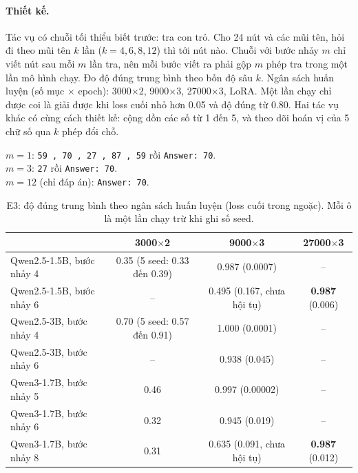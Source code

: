 \documentclass[11pt]{article}
\begin{document}
\paragraph{Thiết kế.} Tác vụ có chuỗi tối thiểu biết trước: tra con trỏ. Cho 24 nút và các mũi tên, hỏi đi
theo mũi tên $k$ lần ($k=4,6,8,12$) thì tới nút nào. Chuỗi với bước nhảy $m$ chỉ viết nút sau mỗi $m$ lần
tra, nên mỗi bước viết ra phải gộp $m$ phép tra trong một lần mô hình chạy. Đo độ đúng trung bình theo bốn
độ sâu $k$. Ngân sách huấn luyện (số mục $\times$ epoch): 3000$\times$2, 9000$\times$3, 27000$\times$3,
LoRA. Một lần chạy chỉ được coi là giải được khi loss cuối nhỏ hơn 0.05 và độ đúng từ 0.80. Hai tác vụ
khác có cùng cách thiết kế: cộng dồn các số từ 1 đến 5, và theo dõi hoán vị của 5 chữ số qua $k$ phép đổi
chỗ.

\begin{vidu}
$m=1$: \texttt{59 , 70 , 27 , 87 , 59} rồi \texttt{Answer: 70}.\\
$m=3$: \texttt{27} rồi \texttt{Answer: 70}.\\
$m=12$ (chỉ đáp án): \texttt{Answer: 70}.
\end{vidu}

\begin{table}[h]
\centering\footnotesize
\caption{E3: độ đúng trung bình theo ngân sách huấn luyện (loss cuối trong ngoặc). Mỗi ô là một lần chạy
trừ khi ghi số seed.}
\setlength{\tabcolsep}{4pt}
\begin{tabular}{lccc}
\toprule
 & 3000$\times$2 & 9000$\times$3 & 27000$\times$3 \\
\midrule
Qwen2.5-1.5B, bước nhảy 4 & 0.35 (5 seed: 0.33 đến 0.39) & 0.987 (0.0007) & -- \\
Qwen2.5-1.5B, bước nhảy 6 & -- & 0.495 (0.167, chưa hội tụ) & \textbf{0.987} (0.006) \\
Qwen2.5-3B, bước nhảy 4 & 0.70 (5 seed: 0.57 đến 0.91) & 1.000 (0.0001) & -- \\
Qwen2.5-3B, bước nhảy 6 & -- & 0.938 (0.045) & -- \\
Qwen3-1.7B, bước nhảy 5 & 0.46 & 0.997 (0.00002) & -- \\
Qwen3-1.7B, bước nhảy 6 & 0.32 & 0.945 (0.019) & -- \\
Qwen3-1.7B, bước nhảy 8 & 0.31 & 0.635 (0.091, chưa hội tụ) & \textbf{0.987} (0.012) \\
\bottomrule
\end{tabular}
\end{table}
\end{document}
